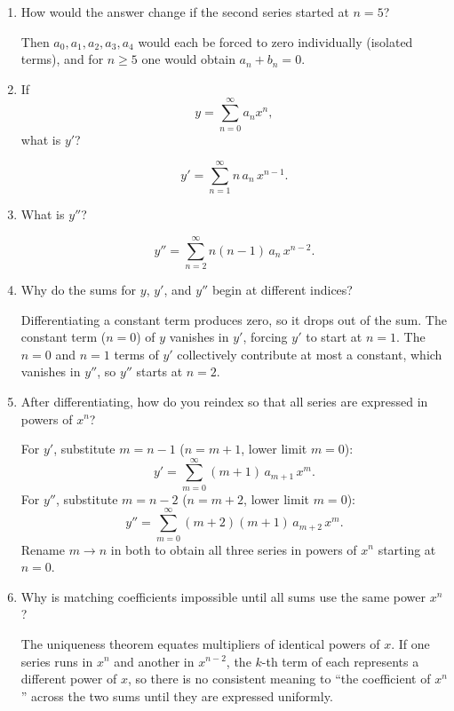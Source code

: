 \documentclass{self-check}
\begin{document}
\begin{enumerate}[leftmargin=*, itemsep=8pt]
  \item How would the answer change if the second series started at \(n=5\)?
    \begin{answer}
      Then $a_0, a_1, a_2, a_3, a_4$ would each be forced to zero individually
      (isolated terms), and for $n \ge 5$ one would obtain $a_n + b_n = 0$.
    \end{answer}

  \item If \[ y=\sum_{n=0}^{\infty} a_n x^n, \] what is \(y'\)?
    \begin{answer}
      \[
        y' = \sum_{n=1}^{\infty} n\, a_n\, x^{n-1}.
      \]
    \end{answer}

  \item What is \(y''\)?
    \begin{answer}
      \[
        y'' = \sum_{n=2}^{\infty} n(n-1)\, a_n\, x^{n-2}.
      \]
    \end{answer}

  \item Why do the sums for \(y\), \(y'\), and \(y''\) begin at
    different indices?
    \begin{answer}
      Differentiating a constant term produces zero, so it drops out of the sum.
      The constant term ($n=0$) of $y$ vanishes in $y'$, forcing $y'$
      to start at
      $n=1$. The $n=0$ and $n=1$ terms of $y'$ collectively
      contribute at most a
      constant, which vanishes in $y''$, so $y''$ starts at $n=2$.
    \end{answer}

  \item After differentiating, how do you reindex so that all series
    are expressed in powers of \(x^n\)?
    \begin{answer}
      For $y'$, substitute $m = n-1$ ($n = m+1$, lower limit $m=0$):
      \[
        y' = \sum_{m=0}^{\infty} (m+1)\,a_{m+1}\,x^m.
      \]
      For $y''$, substitute $m = n-2$ ($n = m+2$, lower limit $m=0$):
      \[
        y'' = \sum_{m=0}^{\infty} (m+2)(m+1)\,a_{m+2}\,x^m.
      \]
      Rename $m \to n$ in both to obtain all three series in powers
      of $x^n$ starting
      at $n=0$.
    \end{answer}

  \item Why is matching coefficients impossible until all sums use
    the same power \(x^n\)?
    \begin{answer}
      The uniqueness theorem equates multipliers of identical powers
      of $x$. If one
      series runs in $x^n$ and another in $x^{n-2}$, the $k$-th term of each
      represents a different power of $x$, so there is no consistent meaning to
      ``the coefficient of $x^n$'' across the two sums until they are expressed
      uniformly.
    \end{answer}


\end{enumerate}
\end{document}
